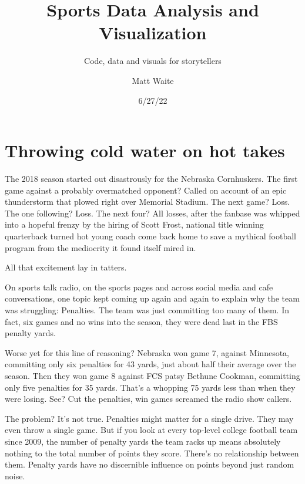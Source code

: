 \documentclass[
  letterpaper,
  DIV=11,
  numbers=noendperiod]{scrreprt}
\title{Sports Data Analysis and Visualization}
\subtitle{Code, data and visuals for storytellers}
\author{Matt Waite}
\date{6/27/22}
\renewcommand*\contentsname{Table of contents}
\newcommand\contentsname{Table of contents}
\begin{document}
\maketitle
\ifdefined\Shaded\renewenvironment{Shaded}{\begin{tcolorbox}[boxrule=0pt, interior hidden, frame hidden, breakable, borderline west={3pt}{0pt}{shadecolor}, enhanced, sharp corners]}{\end{tcolorbox}}\fi

\renewcommand*\contentsname{Table of contents}
{
\hypersetup{linkcolor=}
\setcounter{tocdepth}{2}
\tableofcontents
}

\hypertarget{throwing-cold-water-on-hot-takes}{%
\chapter{Throwing cold water on hot
takes}\label{throwing-cold-water-on-hot-takes}}

The 2018 season started out disastrously for the Nebraska Cornhuskers.
The first game against a probably overmatched opponent? Called on
account of an epic thunderstorm that plowed right over Memorial Stadium.
The next game? Loss. The one following? Loss. The next four? All losses,
after the fanbase was whipped into a hopeful frenzy by the hiring of
Scott Frost, national title winning quarterback turned hot young coach
come back home to save a mythical football program from the mediocrity
it found itself mired in.

All that excitement lay in tatters.

On sports talk radio, on the sports pages and across social media and
cafe conversations, one topic kept coming up again and again to explain
why the team was struggling: Penalties. The team was just committing too
many of them. In fact, six games and no wins into the season, they were
dead last in the FBS penalty yards.

Worse yet for this line of reasoning? Nebraska won game 7, against
Minnesota, committing only six penalties for 43 yards, just about half
their average over the season. Then they won game 8 against FCS patsy
Bethune Cookman, committing only five penalties for 35 yards. That's a
whopping 75 yards less than when they were losing. See? Cut the
penalties, win games screamed the radio show callers.

The problem? It's not true. Penalties might matter for a single drive.
They may even throw a single game. But if you look at every top-level
college football team since 2009, the number of penalty yards the team
racks up means absolutely nothing to the total number of points they
score. There's no relationship between them. Penalty yards have no
discernible influence on points beyond just random noise.
\end{document}
